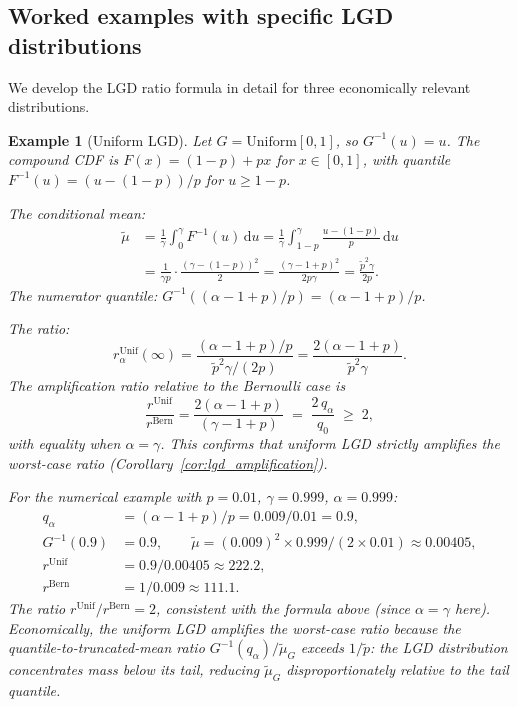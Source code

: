 \documentclass[11pt]{article}
\newtheorem{example}[theorem]{Example}
\theoremstyle{definition}
\newcommand{\dd}{\mathrm{d}}
\newcommand{\1}{\mathbf{1}}
\begin{document}
\subsection{Worked examples with specific LGD distributions}\label{sec:lgd_examples}

We develop the LGD ratio formula in detail for three economically relevant distributions.

\begin{example}[Uniform LGD]\label{ex:uniform_lgd}
Let $G = \mathrm{Uniform}[0,1]$, so $G^{-1}(u) = u$. The compound CDF is $F(x) = (1-p) + px$ for $x \in [0,1]$, with quantile $F^{-1}(u) = (u - (1-p))/p$ for $u \geq 1-p$.

The conditional mean:
\begin{align*}
  \tilde{\mu} &= \frac{1}{\gamma}\int_0^\gamma F^{-1}(u)\,\dd u = \frac{1}{\gamma}\int_{1-p}^\gamma \frac{u-(1-p)}{p}\,\dd u \\
  &= \frac{1}{\gamma p} \cdot \frac{(\gamma - (1-p))^2}{2} = \frac{(\gamma - 1 + p)^2}{2p\gamma} = \frac{\tilde{p}^2\gamma}{2p}.
\end{align*}
The numerator quantile: $G^{-1}((\alpha-1+p)/p) = (\alpha-1+p)/p$.

The ratio:
\begin{equation}\label{eq:ratio_uniform}
  r_\alpha^{\mathrm{Unif}}(\infty) = \frac{(\alpha-1+p)/p}{\tilde{p}^2\gamma/(2p)} = \frac{2(\alpha-1+p)}{\tilde{p}^2\gamma}.
\end{equation}
The amplification ratio relative to the Bernoulli case is
\[
  \frac{r^{\mathrm{Unif}}}{r^{\mathrm{Bern}}} = \frac{2(\alpha-1+p)}{(\gamma-1+p)} \;=\; \frac{2\,q_\alpha}{q_0} \;\geq\; 2,
\]
with equality when $\alpha = \gamma$. This confirms that uniform LGD strictly amplifies the worst-case ratio (Corollary~\ref{cor:lgd_amplification}).

For the numerical example with $p = 0.01$, $\gamma = 0.999$, $\alpha = 0.999$:
\begin{align*}
  q_\alpha &= (\alpha - 1 + p)/p = 0.009/0.01 = 0.9, \\
  G^{-1}(0.9) &= 0.9, \qquad \tilde{\mu} = (0.009)^2 \times 0.999 / (2 \times 0.01) \approx 0.00405, \\
  r^{\mathrm{Unif}} &= 0.9 / 0.00405 \approx 222.2, \\
  r^{\mathrm{Bern}} &= 1 / 0.009 \approx 111.1.
\end{align*}
The ratio $r^{\mathrm{Unif}} / r^{\mathrm{Bern}} = 2$, consistent with the formula above (since $\alpha = \gamma$ here). Economically, the uniform LGD amplifies the worst-case ratio because the quantile-to-truncated-mean ratio $G^{-1}(q_\alpha)/\tilde{\mu}_G$ exceeds $1/\tilde{p}$: the LGD distribution concentrates mass below its tail, reducing $\tilde{\mu}_G$ disproportionately relative to the tail quantile.
\end{example}
\end{document}
